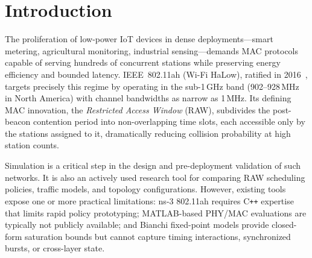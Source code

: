 \documentclass[conference]{IEEEtran}
\begin{document}
\section{Introduction}
\label{sec:intro}

The proliferation of low-power IoT devices in dense
deployments---smart metering, agricultural monitoring, industrial sensing---demands
MAC protocols capable of serving hundreds of concurrent stations while
preserving energy efficiency and bounded latency.
IEEE~802.11ah (Wi-Fi HaLow), ratified in 2016~\cite{std80211ah}, targets
precisely this regime by operating in the sub-1\,GHz band (902--928\,MHz in
North America) with channel bandwidths as narrow as 1\,MHz.
Its defining MAC innovation, the \emph{Restricted Access Window} (RAW),
subdivides the post-beacon contention period into non-overlapping time slots,
each accessible only by the stations assigned to it, dramatically reducing
collision probability at high station counts.

Simulation is a critical step in the design and pre-deployment validation of
such networks.
It is also an actively used research tool for comparing RAW scheduling
policies, traffic models, and topology configurations.
However, existing tools expose one or more practical limitations: ns-3 802.11ah
requires C\texttt{++} expertise that limits rapid policy prototyping;
MATLAB-based PHY/MAC evaluations are typically not publicly available; and
Bianchi fixed-point models provide closed-form saturation bounds but cannot
capture timing interactions, synchronized bursts, or cross-layer state.
\end{document}
